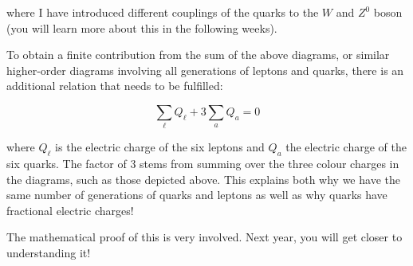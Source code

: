 \begin{center}
\end{center}


where I have introduced different couplings of the quarks to the $W$ and $Z^0$ boson (you will learn more about this in the following weeks).

To obtain a finite contribution from the sum of the above diagrams, or similar higher-order diagrams involving all generations of leptons and quarks, there is an additional relation that needs to be fulfilled:

\[
\sum_{\ell}Q_{\ell}+3\sum_a Q_a=0
\]

where $Q_{\ell}$ is the electric charge of the six leptons and $Q_a$ the electric charge of the six quarks. The factor of 3 stems from summing over the three colour charges in the diagrams, such as those depicted above. This explains both why we have the same number of generations of quarks and leptons as well as why quarks have fractional electric charges!

The mathematical proof of this is very involved. Next year, you will get closer to understanding it!

